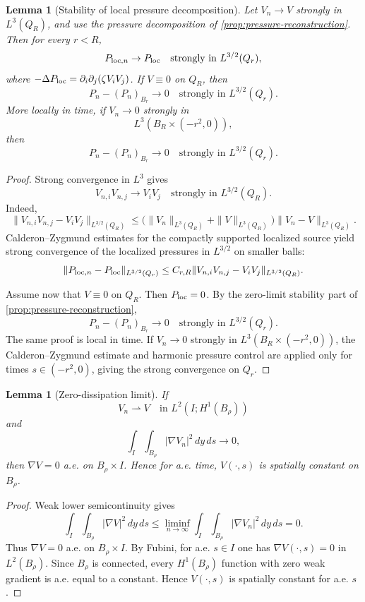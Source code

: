 \documentclass[11pt]{amsart}
\theoremstyle{plain}
\newtheorem{lemma}[theorem]{Lemma}
\theoremstyle{definition}
\theoremstyle{remark}
\begin{document}
\begin{lemma}[Stability of local pressure decomposition]\label{lem:pressure-stability}
Let \(V_n\to V\) strongly in \(L^3(Q_R)\), and use the pressure decomposition
of \cref{prop:pressure-reconstruction}.  Then for every \(r<R\),
\[
  P_{{\rm loc},n}\to P_{\rm loc}
  \quad\text{strongly in }L^{3/2}(Q_r),
\]
where \(-\Delta P_{\rm loc}=\partial_i\partial_j(\zeta V_iV_j)\).  If
\(V\equiv0\) on \(Q_R\), then
\[
  P_n-(P_n)_{B_r}\to0
  \quad\text{strongly in }L^{3/2}(Q_r).
\]
More locally in time, if \(V_n\to0\) strongly in
\[
  L^3(B_R\times(-r^2,0)),
\]
then
\[
  P_n-(P_n)_{B_r}\to0
  \quad\text{strongly in }L^{3/2}(Q_r).
\]
\end{lemma}

\begin{proof}
Strong convergence in \(L^3\) gives
\[
  V_{n,i}V_{n,j}\to V_iV_j
  \quad\text{strongly in }L^{3/2}(Q_R).
\]
Indeed,
\[
  \|V_{n,i}V_{n,j}-V_iV_j\|_{L^{3/2}(Q_R)}
  \le
  \bigl(\|V_n\|_{L^3(Q_R)}+\|V\|_{L^3(Q_R)}\bigr)
  \|V_n-V\|_{L^3(Q_R)}.
\]
Calderon--Zygmund estimates for the compactly supported localized source yield
strong convergence of the localized pressures in \(L^{3/2}\) on smaller balls:
\[
  \|P_{{\rm loc},n}-P_{\rm loc}\|_{L^{3/2}(Q_r)}
  \le
  C_{r,R}
  \|V_{n,i}V_{n,j}-V_iV_j\|_{L^{3/2}(Q_R)}.
\]

Assume now that \(V\equiv0\) on \(Q_R\).  Then \(P_{\rm loc}=0\).  By the
zero-limit stability part of \cref{prop:pressure-reconstruction},
\[
  P_n-(P_n)_{B_r}\to0
  \quad\text{strongly in }L^{3/2}(Q_r).
\]
The same proof is local in time.  If \(V_n\to0\) strongly in
\(L^3(B_R\times(-r^2,0))\), the Calderon--Zygmund estimate and harmonic
pressure control are applied only for times \(s\in(-r^2,0)\), giving the
strong convergence on \(Q_r\).
\end{proof}

\begin{lemma}[Zero-dissipation limit]\label{lem:zero-dissipation}
If
\[
  V_n\rightharpoonup V\quad\text{in }L^2(I;H^1(B_\rho))
\]
and
\[
  \int_I\int_{B_\rho}|\nabla V_n|^2\,dy\,ds\to0,
\]
then \(\nabla V=0\) a.e. on \(B_\rho\times I\).  Hence for a.e. time,
\(V(\cdot,s)\) is spatially constant on \(B_\rho\).
\end{lemma}

\begin{proof}
Weak lower semicontinuity gives
\[
  \int_I\int_{B_\rho}|\nabla V|^2\,dy\,ds
  \le \liminf_{n\to\infty}\int_I\int_{B_\rho}|\nabla V_n|^2\,dy\,ds=0.
\]
Thus \(\nabla V=0\) a.e. on \(B_\rho\times I\).  By Fubini, for a.e.
\(s\in I\) one has \(\nabla V(\cdot,s)=0\) in \(L^2(B_\rho)\).  Since
\(B_\rho\) is connected, every \(H^1(B_\rho)\) function with zero weak
gradient is a.e. equal to a constant.  Hence \(V(\cdot,s)\) is spatially
constant for a.e. \(s\).
\end{proof}
\end{document}
